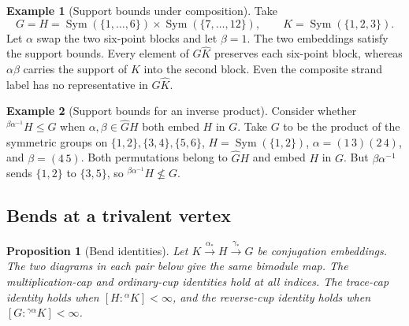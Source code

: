 \documentclass[11pt,a4paper]{article}
\numberwithin{equation}{section}
\newtheorem{proposition}[theorem]{Proposition}
\theoremstyle{definition}
\newtheorem{example}{Example}[section]
\newcommand{\cg}[2]{{}^{#1}\!#2}
\begin{document}
\begin{example}[Support bounds under composition]\label{ex:support-composite}
Take
\[
 G=H=\operatorname{Sym}(\{1,\ldots,6\})
         \times\operatorname{Sym}(\{7,\ldots,12\}),
 \qquad K=\operatorname{Sym}(\{1,2,3\}).
\]
Let \(\alpha\) swap the two six-point blocks and let \(\beta=1\).
The two embeddings satisfy the support bounds.
Every element of \(G\widehat K\) preserves each six-point block,
whereas \(\alpha\beta\) carries the support of \(K\) into the second
block. Even the composite strand label has no representative
in \(G\widehat K\).
\end{example}


\begin{example}[Support bounds for an inverse product]\label{ex:support-inverse-product}
Consider whether \(\cg{\beta\alpha^{-1}}{H}\le G\)
when \(\alpha,\beta\in\widehat G H\) both embed \(H\) in \(G\). Take \(G\) to be the product of the symmetric groups on
\(\{1,2\},\{3,4\},\{5,6\}\), \(H=\operatorname{Sym}(\{1,2\})\),
\(\alpha=(1\,3)(2\,4)\), and \(\beta=(4\,5)\).
Both permutations belong to \(\widehat G H\) and embed \(H\) in \(G\).
But \(\beta\alpha^{-1}\) sends \(\{1,2\}\) to \(\{3,5\}\), so
\(\cg{\beta\alpha^{-1}}{H}\nleq G\).
\end{example}


\subsection{Bends at a trivalent vertex}
\begin{proposition}[Bend identities]\label{prop:trivalent-bends}
Let \(K\xrightarrow{\alpha_*}H\xrightarrow{\gamma_*}G\)
be conjugation embeddings. The two diagrams in each pair below
give the same bimodule map. The multiplication-cap and ordinary-cup
identities hold at all indices. The trace-cap identity holds when
\([H:\cg{\alpha}{K}]<\infty\), and the reverse-cup identity holds when
\([G:\cg{\gamma\alpha}{K}]<\infty\).
\end{proposition}
\end{document}

